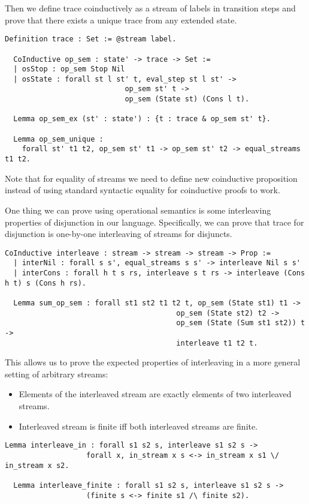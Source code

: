 Then we define trace coinductively as a stream of labels in transition steps and prove that there exists a unique trace from any extended state.

\begin{lstlisting}[language=Coq]
  Definition trace : Set := @stream label.

  CoInductive op_sem : state' -> trace -> Set :=
  | osStop : op_sem Stop Nil
  | osState : forall st l st' t, eval_step st l st' ->
                            op_sem st' t ->
                            op_sem (State st) (Cons l t).

  Lemma op_sem_ex (st' : state') : {t : trace & op_sem st' t}.

  Lemma op_sem_unique :
    forall st' t1 t2, op_sem st' t1 -> op_sem st' t2 -> equal_streams t1 t2.
\end{lstlisting}

Note that for equality of streams we need to define new coinductive proposition instead of using standard syntactic equality for coinductive proofs to work.

One thing we can prove using operational semantics is some interleaving properties of disjunction in our language. Specifically, we can prove that trace for disjunction is one-by-one interleaving of streams for disjuncts.

\begin{lstlisting}[language=Coq]
  CoInductive interleave : stream -> stream -> stream -> Prop :=
  | interNil : forall s s', equal_streams s s' -> interleave Nil s s'
  | interCons : forall h t s rs, interleave s t rs -> interleave (Cons h t) s (Cons h rs).

  Lemma sum_op_sem : forall st1 st2 t1 t2 t, op_sem (State st1) t1 ->
                                        op_sem (State st2) t2 ->
                                        op_sem (State (Sum st1 st2)) t ->
                                        interleave t1 t2 t.
\end{lstlisting}

This allows us to prove the expected properties of interleaving in a more general setting of arbitrary streams:

\begin{itemize}
\item  Elements of the interleaved stream are exactly elements of two interleaved streams.
\item  Interleaved stream is finite iff both interleaved streams are finite.
\end{itemize}

\begin{lstlisting}[language=Coq]
  Lemma interleave_in : forall s1 s2 s, interleave s1 s2 s ->
                   forall x, in_stream x s <-> in_stream x s1 \/ in_stream x s2.

  Lemma interleave_finite : forall s1 s2 s, interleave s1 s2 s ->
                   (finite s <-> finite s1 /\ finite s2).
\end{lstlisting}
